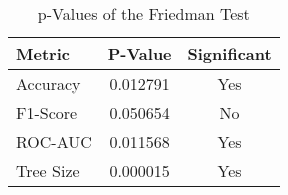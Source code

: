
    \begin{table}[H]
        \centering
        \renewcommand{\arraystretch}{1.2}
        \caption{p-Values of the Friedman Test}
        \label{tab:fitness_friedman}
    \begin{tabular}{lcc}
\toprule
Metric & P-Value & Significant \\
\midrule
Accuracy & 0.012791 & Yes \\
F1-Score & 0.050654 & No \\
ROC-AUC & 0.011568 & Yes \\
Tree Size & 0.000015 & Yes \\
\bottomrule
\end{tabular}

        
    \end{table}
    